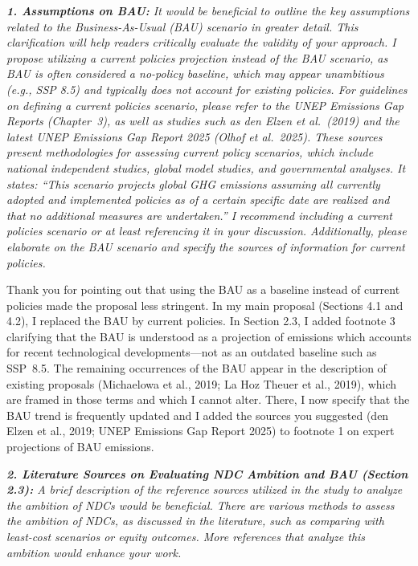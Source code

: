 \documentclass[11pt]{article}
\newenvironment{italic}{\itshape}{\par}
\begin{document}
\begin{italic}
\textbf{1. Assumptions on BAU:} It would be beneficial to outline the key assumptions related to the Business-As-Usual (BAU) scenario in greater detail. This clarification will help readers critically evaluate the validity of your approach. I propose utilizing a current policies projection instead of the BAU scenario, as BAU is often considered a no-policy baseline, which may appear unambitious (e.g., SSP 8.5) and typically does not account for existing policies. For guidelines on defining a current policies scenario, please refer to the UNEP Emissions Gap Reports (Chapter~3), as well as studies such as den Elzen et al.\ (2019) and the latest UNEP Emissions Gap Report 2025 (Olhof et al.\ 2025). These sources present methodologies for assessing current policy scenarios, which include national independent studies, global model studies, and governmental analyses. It states: ``This scenario projects global GHG emissions assuming all currently adopted and implemented policies as of a certain specific date are realized and that no additional measures are undertaken.'' I recommend including a current policies scenario or at least referencing it in your discussion. Additionally, please elaborate on the BAU scenario and specify the sources of information for current policies.
\end{italic}

Thank you for pointing out that using the BAU as a baseline instead of current policies made the proposal less stringent. In my main proposal (Sections 4.1 and 4.2), I replaced the BAU by current policies. In Section 2.3, I added footnote 3 clarifying that the BAU is understood as a projection of emissions which accounts for recent technological developments---not as an outdated baseline such as SSP~8.5. The remaining occurrences of the BAU appear in the description of existing proposals (Michaelowa et al., 2019; La Hoz Theuer et al., 2019), which are framed in those terms and which I cannot alter. There, I now specify that the BAU trend is frequently updated and I added the sources you suggested (den Elzen et al., 2019; UNEP Emissions Gap Report 2025) to footnote 1 on expert projections of BAU emissions.




\begin{italic}
\textbf{2. Literature Sources on Evaluating NDC Ambition and BAU (Section 2.3):} A brief description of the reference sources utilized in the study to analyze the ambition of NDCs would be beneficial. There are various methods to assess the ambition of NDCs, as discussed in the literature, such as comparing with least-cost scenarios or equity outcomes. More references that analyze this ambition would enhance your work.
\end{italic}
\end{document}
